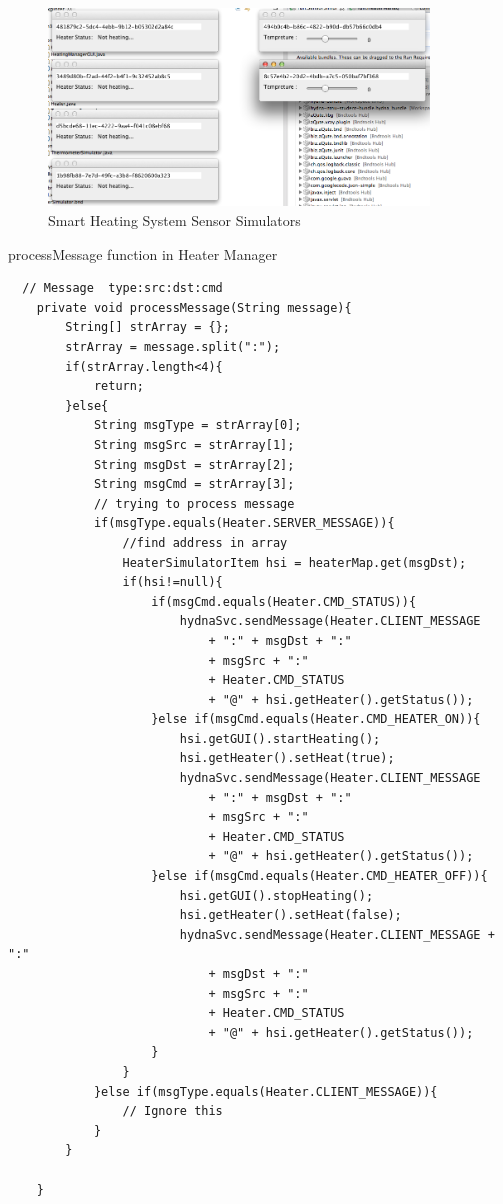 \begin{figure}
	\centering    	
\includegraphics[width=0.90\textwidth,natwidth=610,natheight=642]{figs/sensor_simulators.png}
  	\caption{Smart Heating System Sensor Simulators}
  	\label{fig:sensor_simulators}
\end{figure}

\clearpage

\begin{algorithm}[h]
  \caption{processMessage function in Heater Manager}
  \label{code:heater_process_message}
  \begin{verbatim}
  // Message  type:src:dst:cmd
	private void processMessage(String message){
		String[] strArray = {};
		strArray = message.split(":");
		if(strArray.length<4){
			return;
		}else{
			String msgType = strArray[0];
			String msgSrc = strArray[1];
			String msgDst = strArray[2];
			String msgCmd = strArray[3];
			// trying to process message
			if(msgType.equals(Heater.SERVER_MESSAGE)){
				//find address in array
				HeaterSimulatorItem hsi = heaterMap.get(msgDst);
				if(hsi!=null){
					if(msgCmd.equals(Heater.CMD_STATUS)){
						hydnaSvc.sendMessage(Heater.CLIENT_MESSAGE 
							+ ":" + msgDst + ":" 
							+ msgSrc + ":" 
							+ Heater.CMD_STATUS 
							+ "@" + hsi.getHeater().getStatus());
					}else if(msgCmd.equals(Heater.CMD_HEATER_ON)){
						hsi.getGUI().startHeating();
						hsi.getHeater().setHeat(true);
						hydnaSvc.sendMessage(Heater.CLIENT_MESSAGE 
							+ ":" + msgDst + ":" 
							+ msgSrc + ":" 
							+ Heater.CMD_STATUS 
							+ "@" + hsi.getHeater().getStatus());
					}else if(msgCmd.equals(Heater.CMD_HEATER_OFF)){
						hsi.getGUI().stopHeating();
						hsi.getHeater().setHeat(false);
						hydnaSvc.sendMessage(Heater.CLIENT_MESSAGE + ":" 
							+ msgDst + ":" 
							+ msgSrc + ":" 
							+ Heater.CMD_STATUS 
							+ "@" + hsi.getHeater().getStatus());
					}
				}
			}else if(msgType.equals(Heater.CLIENT_MESSAGE)){
				// Ignore this
			}
		}
		
	}
 \end{verbatim}
\end{algorithm}


